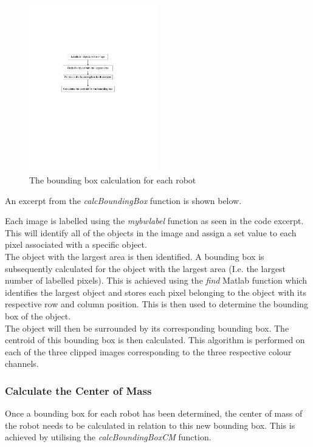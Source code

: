 \documentclass{article}
\begin{document}
\begin{figure}[h!] 
  \centering
    \includegraphics[width=0.5\textwidth]{../Drawings/boundingbox.pdf}
    \caption{The bounding box calculation for each robot }
    \label{fig:bounding}
\end{figure}

An excerpt from the \textit{calcBoundingBox} function is shown below.



Each image is labelled using the \textit{mybwlabel} function as seen in the code excerpt. This will identify all of the objects in the image and assign a set value to each pixel associated with a specific object.  \\

The object with the largest area is then identified. A bounding box is subsequently calculated for the object with the largest area (I.e. the largest number of labelled pixels). This is achieved using the \textit{find} Matlab function which identifies the largest object and stores each pixel belonging to the object with its respective row and column position. This is then used to determine the bounding box of the object.\\

The object will then be surrounded by its corresponding bounding box. The centroid of this bounding box is then calculated. This algorithm is performed on each of the three clipped images corresponding to the three respective colour channels.\\

\subsubsection{Calculate the Center of Mass}
\label{sec:cm}
Once a bounding box for each robot has been determined, the center of mass of the robot needs to be calculated in relation to this new bounding box. This is achieved by utilising the \textit{calcBoundingBoxCM} function.\\
\end{document}
